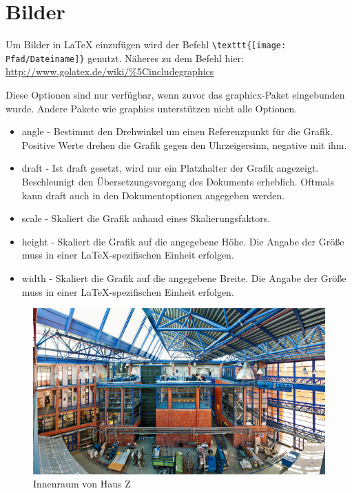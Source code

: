 \chapter{Bilder}

Um Bilder in \LaTeX{} einzufügen wird der Befehl \verb|\texttt{[image: Pfad/Dateiname]}| genutzt. Näheres zu dem Befehl hier: \url{http://www.golatex.de/wiki/%5Cincludegraphics}

Diese Optionen sind nur verfügbar, wenn zuvor das graphicx-Paket eingebunden wurde. Andere Pakete wie graphics unterstützen nicht alle Optionen.	
\begin{itemize}
\item angle - Bestimmt den Drehwinkel um einen Referenzpunkt für die Grafik. Positive Werte drehen die Grafik gegen den Uhrzeigersinn, negative mit ihm.
\item draft - Ist draft gesetzt, wird nur ein Platzhalter der Grafik angezeigt. Beschleunigt den Übersetzungsvorgang des Dokuments erheblich. Oftmals kann draft auch in den Dokumentoptionen angegeben werden.
\item scale - Skaliert die Grafik anhand eines Skalierungsfaktors.
\item height - Skaliert die Grafik auf die angegebene Höhe. Die Angabe der Größe muss in einer LaTeX-spezifischen Einheit erfolgen.
\item width - Skaliert die Grafik auf die angegebene Breite. Die Angabe der Größe muss in einer LaTeX-spezifischen Einheit erfolgen.
\end{itemize}	

\begin{figure}[ht]
	\centering
	\includegraphics{images/Haus_Z.jpeg}
	\caption{Innenraum von Haus Z \autocite{hauszpic}}
	\label{fig1}
\end{figure}

